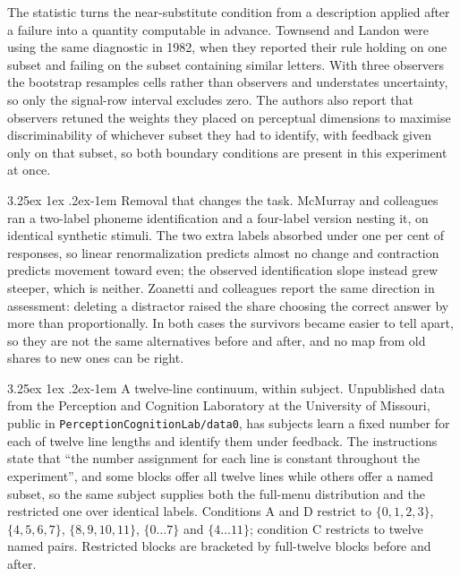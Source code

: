 \documentclass[11pt]{article}
\makeatletter
\theoremstyle{italichead}
\renewcommand\paragraph{\@startsection{paragraph}{4}{\z@}%
  {3.25ex \@plus1ex \@minus.2ex}{-1em}%
  {\normalfont\normalsize\itshape}}
\makeatother
\begin{document}
The statistic turns the near-substitute condition from a description applied after a failure
into a quantity computable in advance. Townsend and Landon \cite{townsendlandon1982} were
using the same diagnostic in 1982, when they reported their rule holding on one subset and
failing on the subset containing similar letters. With three observers the bootstrap
resamples cells rather than observers and understates uncertainty, so only the signal-row
interval excludes zero. The authors also report that observers retuned the weights they placed
on perceptual dimensions to maximise discriminability of whichever subset they had to identify,
with feedback given only on that subset, so both boundary conditions are present in this
experiment at once.

\paragraph{Removal that changes the task.} McMurray and colleagues \cite{mcmurray2008} ran a
two-label phoneme identification and a four-label version nesting it, on identical synthetic
stimuli. The two extra labels absorbed under one per cent of responses, so linear renormalization
predicts almost no change and contraction predicts movement toward even; the observed
identification slope instead grew steeper, which is neither. Zoanetti and colleagues
\cite{zoanetti2013} report the same direction in assessment: deleting a distractor raised the
share choosing the correct answer by more than proportionally. In both cases the survivors
became easier to tell apart, so they are not the same alternatives before and after, and no
map from old shares to new ones can be right.

\paragraph{A twelve-line continuum, within subject.} Unpublished data from the Perception and
Cognition Laboratory at the University of Missouri, public in
\texttt{PerceptionCognitionLab/data0}, has subjects learn a fixed number for each of twelve
line lengths and identify them under feedback. The instructions state that ``the number
assignment for each line is constant throughout the experiment'', and some blocks offer all
twelve lines while others offer a named subset, so the same subject supplies both the full-menu
distribution and the restricted one over identical labels. Conditions A and D restrict to
$\{0,1,2,3\}$, $\{4,5,6,7\}$, $\{8,9,10,11\}$, $\{0\ldots7\}$ and $\{4\ldots11\}$; condition C
restricts to twelve named pairs. Restricted blocks are bracketed by full-twelve blocks before
and after.
\end{document}
